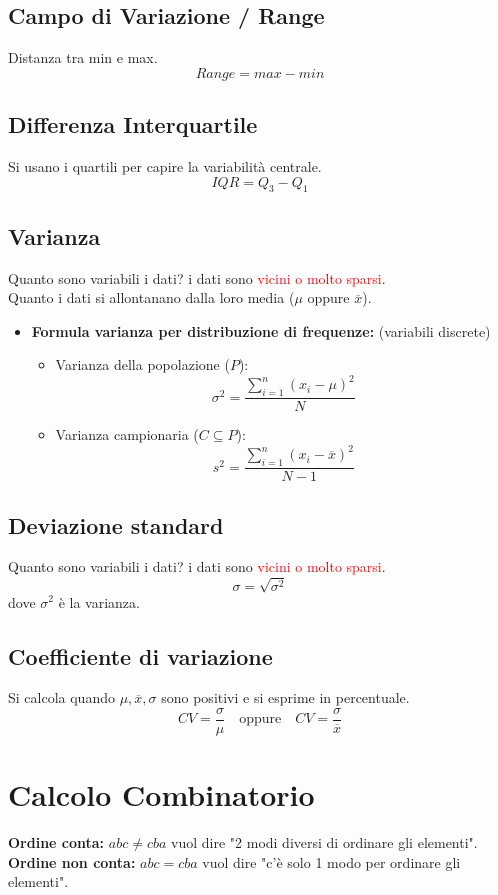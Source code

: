 \documentclass{article}  %
\theoremstyle{definition}
\begin{document}
\subsection{Campo di Variazione / Range}
Distanza tra min e max.
\[Range = max-min\]
\subsection{Differenza Interquartile}
Si usano i quartili per capire la variabilità centrale.
\[
	IQR=Q_3-Q_1
\]
\subsection{Varianza}
Quanto sono variabili i dati? i dati sono \textcolor{red}{vicini o molto sparsi}. \\
Quanto i dati si allontanano dalla loro media ($\mu$ oppure $\overline{x}$).
\begin{itemize}
	\item \textbf{Formula varianza per distribuzione di frequenze:} (variabili discrete)
	      \begin{itemize}
		      \item Varianza della popolazione ($P$):
		            \[ \sigma^2= \frac{\sum_{i=1}^{n} (x_i-\mu)^2}{N} \]
		      \item Varianza campionaria ($C \subseteq P$):
		            \[ s^2= \frac{\sum_{i=1}^{n} (x_i-\overline{x})^2}{N-1} \]
	      \end{itemize}
\end{itemize}

\subsection{Deviazione standard}
Quanto sono variabili i dati? i dati sono \textcolor{red}{vicini o molto sparsi}.
\[\sigma=\sqrt{\sigma^2}\]
dove $\sigma^2$ è la varianza.
\subsection{Coefficiente di variazione}
Si calcola quando $\mu, \overline{x}, \sigma$ sono positivi e si esprime in percentuale.
\[
	CV=\frac{\sigma}{\mu} \quad \text{oppure} \quad CV=\frac{\sigma}{\overline{x}}
\]
\break
\section{Calcolo Combinatorio}
\textbf{Ordine conta:} $abc \neq cba$ vuol dire "2 modi diversi di ordinare gli elementi".  \\
\textbf{Ordine non conta:} $abc = cba$ vuol dire "c'è solo 1 modo per ordinare gli elementi". \\
\end{document}

